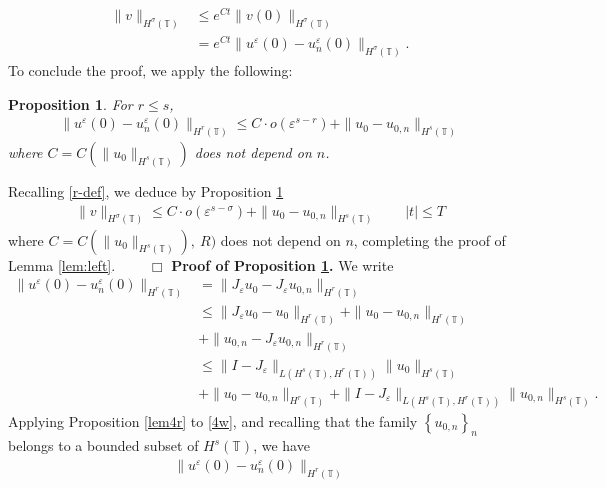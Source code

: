\documentclass[12pt,reqno]{amsart}
\newcommand{\ci}{\mathbb{T}}
\newcommand{\ee}{\varepsilon}
\theoremstyle{plain}  %
\newtheorem{proposition}{Proposition}
\theoremstyle{definition}
\begin{document}
\begin{appendices}
\begin{equation*}
\begin{split}
		\|v\|_{H^{\sigma}(\ci)}
		& \le e^{C t}\|v(0)\|_{H^{\sigma}(\ci)}
		\\
		& = e^{C t}\|u^\ee(0) - u^\ee_n(0) \|_{H^{\sigma}(\ci)}.
	\end{split}
\end{equation*}
To conclude the proof, we apply the following:
\begin{proposition}
		\label{lem11r}
	For $r \le s$,
	\begin{equation}
		\begin{split}
			\|u^\ee(0) - u_n^\ee (0) \|_{H^r(\ci)} \le C
			\cdot o(\ee^{s-r}) + \|u_0 - u_{0,n} \|_{H^s(\ci)}
			\label{3w}
		\end{split}
	\end{equation}
	where $C=C(\|u_0\|_{H^s(\ci)})$ does not depend on $n$.
\end{proposition}
%
%
Recalling \eqref{r-def}, we deduce by Proposition \ref{lem11r}
\begin{equation*}
	\begin{split}
		\|v\|_{H^{\sigma}(\ci)} \le C \cdot o(\ee^{s - \sigma}) + \|u_0 -
		u_{0,n} \|_{H^s(\ci)} \qquad |t| \le T
	\end{split}
\end{equation*}
where $C=C(\|u_0\|_{H^s(\ci)}), \ R)$ does not depend
on $n$, completing the proof of Lemma \ref{lem:left}. $\qquad \Box$
%
\vskip0.1in
%
{\bf Proof of Proposition \ref{lem11r}.} We write
\medskip
\begin{equation}
	\begin{split}
		\|u^\ee(0) - u_n^\ee (0) \|_{H^r(\ci)} 
		& = \|J_\ee u_0 - J_\ee u_{0,n} \|_{H^r(\ci)}
		\\
		& \le \|J_\ee u_0 - u_0 \|_{H^r(\ci)} + \| u_0 - u_{0,n}
		\|_{H^r(\ci)}
		\\
		& + \|u_{0,n} - J_\ee u_{0,n} \|_{H^r(\ci)}
		\\
		& \le \|I - J_\ee\|_{L(H^s(\ci), H^r(\ci))} \|u_0\|_{H^s(\ci)}
		\\
		& +
		\|u_0 - u_{0,n} \|_{H^r(\ci)} + 
		\|I - J_\ee\|_{L(H^s(\ci), H^r(\ci))} \|u_{0,n}\|_{H^s(\ci)}.
		\label{4w}
	\end{split}
\end{equation}
Applying Proposition \ref{lem4r} to \eqref{4w}, and recalling that the family
$\left\{ u_{0,n} \right\}_n$ belongs to a bounded subset of
$H^s(\ci)$, we have
\medskip
\begin{equation}
	\label{finito}
	\begin{split}
		\|u^\ee(0) - u_n^\ee (0) \|_{H^r(\ci)} 

\end{split}
\end{equation}
\end{appendices}
\end{document}

